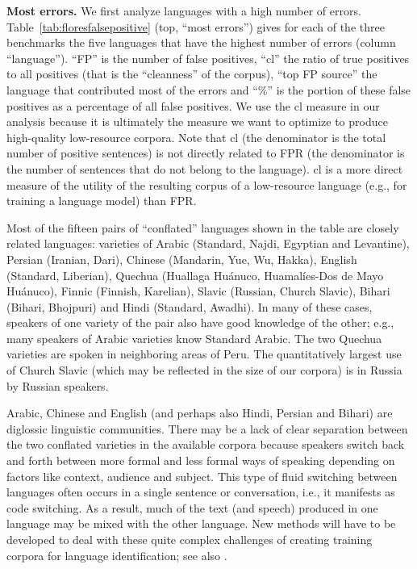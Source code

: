 \documentclass[11pt]{article}
\def\tabref#1{Table~\ref{tab:#1}}
\begin{document}
\textbf{Most errors.}
We first analyze
languages with a high number of errors.
\tabref{floresfalsepositive} (top, ``most errors'')
gives
for each of the three
benchmarks 
the five languages that have the highest number of errors
(column ``language''). ``FP'' is the number of false
positives, ``cl'' the ratio of true positives to all
positives (that is the ``cleanness'' of the corpus), ``top
FP source'' the language that contributed most of the errors
and ``\%'' is the portion of these false positives as a
percentage of all false positives.
We use the cl measure in our analysis
because it is ultimately the measure we want to optimize to
produce high-quality low-resource corpora.
Note that cl (the denominator is the total  number of positive sentences) is
not directly related to FPR (the denominator is the number of
sentences  that do not belong to the language). cl is a more
direct measure of the utility of the resulting corpus of a
low-resource language (e.g., for training a language
model) than FPR.

Most of the fifteen pairs of ``conflated'' languages
shown in the table are
closely related languages: varieties of Arabic (Standard,
Najdi, Egyptian and Levantine), Persian (Iranian, Dari), Chinese (Mandarin, Yue,
Wu, Hakka), English (Standard, Liberian), Quechua (Huallaga
Huánuco, Huamalíes-Dos de Mayo Huánuco), Finnic (Finnish,
Karelian), Slavic (Russian, Church Slavic), Bihari
(Bihari, Bhojpuri) and Hindi (Standard, Awadhi).  In many of
these cases, speakers of one variety of the pair also have
good knowledge of the other; e.g., many speakers of Arabic
varieties know Standard Arabic. The two Quechua varieties
are spoken in neighboring areas of Peru. The quantitatively
largest use of Church Slavic  (which may be reflected in the
size of our corpora) is in Russia by Russian speakers.

Arabic, Chinese and English (and perhaps also Hindi,
Persian and Bihari) are diglossic linguistic communities.
There may be a lack of  clear separation between
the two conflated varieties  in the available corpora because
speakers switch back and forth between more formal and less
formal ways of speaking depending on factors like context,
audience and subject.
This type of fluid switching between languages often occurs
in a single sentence or conversation, i.e., it manifests as code switching.
As a result, much of the text (and
speech) produced in one language may be mixed with the
other language.
New methods will have to be developed
to deal with these quite complex challenges of
creating training corpora for
language identification; see also \cite{aguilar-etal-2020-lince}.
\end{document}
